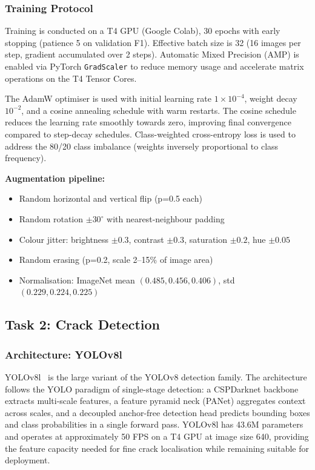 \documentclass[12pt,a4paper]{article}
\begin{document}
\subsubsection{Training Protocol}

Training is conducted on a T4 GPU (Google Colab), 30 epochs with early stopping (patience 5 on validation F1). Effective batch size is 32 (16 images per step, gradient accumulated over 2 steps). Automatic Mixed Precision (AMP) is enabled via PyTorch \texttt{GradScaler} to reduce memory usage and accelerate matrix operations on the T4 Tensor Cores.

The AdamW optimiser is used with initial learning rate $1 \times 10^{-4}$, weight decay $10^{-2}$, and a cosine annealing schedule with warm restarts. The cosine schedule reduces the learning rate smoothly towards zero, improving final convergence compared to step-decay schedules. Class-weighted cross-entropy loss is used to address the 80/20 class imbalance (weights inversely proportional to class frequency).

\textbf{Augmentation pipeline:}
\begin{itemize}[leftmargin=1.5cm]
\item Random horizontal and vertical flip (p=0.5 each)
\item Random rotation $\pm30^\circ$ with nearest-neighbour padding
\item Colour jitter: brightness $\pm0.3$, contrast $\pm0.3$, saturation $\pm0.2$, hue $\pm0.05$
\item Random erasing (p=0.2, scale 2--15\% of image area)
\item Normalisation: ImageNet mean $(0.485, 0.456, 0.406)$, std $(0.229, 0.224, 0.225)$
\end{itemize}

\subsection{Task 2: Crack Detection}
\label{sec:det_methods}

\subsubsection{Architecture: YOLOv8l}

YOLOv8l~\cite{ultralytics2023} is the large variant of the YOLOv8 detection family. The architecture follows the YOLO paradigm of single-stage detection: a CSPDarknet backbone extracts multi-scale features, a feature pyramid neck (PANet) aggregates context across scales, and a decoupled anchor-free detection head predicts bounding boxes and class probabilities in a single forward pass. YOLOv8l has 43.6M parameters and operates at approximately 50 FPS on a T4 GPU at image size 640, providing the feature capacity needed for fine crack localisation while remaining suitable for deployment.
\end{document}
